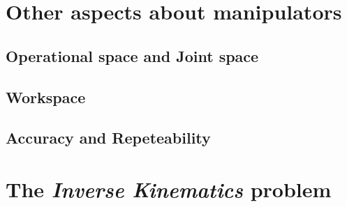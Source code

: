 \section{Other aspects about manipulators}

\subsection{Operational space and Joint space}

\subsection{Workspace}

\subsection{Accuracy and Repeteability}

\section{The \textit{Inverse Kinematics} problem} 